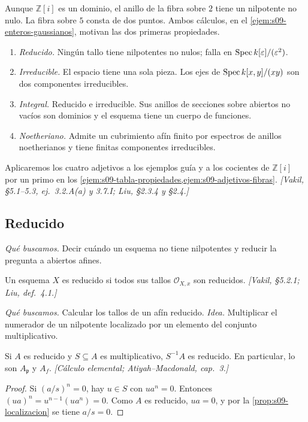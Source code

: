 \begin{obs}
\label{obs:s09-cuatro-propiedades}
Aunque $\mathbb Z[i]$ es un dominio, el anillo de la fibra sobre $2$ tiene un nilpotente no nulo. La fibra sobre $5$ consta de dos puntos. Ambos cálculos, en el \cref{ejem:s09-enteros-gaussianos}, motivan las dos primeras propiedades.
\begin{enumerate}
\item \emph{Reducido.} Ningún tallo tiene nilpotentes no nulos; falla en $\operatorname{Spec} k[\varepsilon]/(\varepsilon^2)$.
\item \emph{Irreducible.} El espacio tiene una sola pieza. Los ejes de $\operatorname{Spec} k[x,y]/(xy)$ son dos componentes irreducibles.
\item \emph{Integral.} Reducido e irreducible. Sus anillos de secciones sobre abiertos no vacíos son dominios y el esquema tiene un cuerpo de funciones.
\item \emph{Noetheriano.} Admite un cubrimiento afín finito por espectros de anillos noetherianos y tiene finitas componentes irreducibles.
\end{enumerate}
Aplicaremos los cuatro adjetivos a los ejemplos guía y a los cocientes de $\mathbb Z[i]$ por un primo en los \cref{ejem:s09-tabla-propiedades,ejem:s09-adjetivos-fibras}. \emph{[Vakil, \S5.1--5.3, ej.~3.2.A(a) y 3.7.I; Liu, \S2.3.4 y \S2.4.]}
\end{obs}

\subsection{Reducido}
\emph{Qué buscamos.} Decir cuándo un esquema no tiene nilpotentes y reducir la pregunta a abiertos afines.

\begin{defi}
\label{defi:s09-esquema-reducido}
Un esquema $X$ es reducido si todos sus tallos $\mathcal O_{X,x}$ son reducidos. \emph{[Vakil, \S5.2.1; Liu, def.~4.1.]}
\end{defi}

\emph{Qué buscamos.} Calcular los tallos de un afín reducido. \emph{Idea.} Multiplicar el numerador de un nilpotente localizado por un elemento del conjunto multiplicativo.

\begin{lema}
\label{lema:s09-localizacion-reducida}
Si $A$ es reducido y $S\subseteq A$ es multiplicativo, $S^{-1}A$ es reducido. En particular, lo son $A_{\mathfrak p}$ y $A_f$. \emph{[Cálculo elemental; Atiyah--Macdonald, cap.~3.]}
\end{lema}
\begin{proof}
Si $(a/s)^n=0$, hay $u\in S$ con $ua^n=0$. Entonces $(ua)^n=u^{n-1}(ua^n)=0$. Como $A$ es reducido, $ua=0$, y por la \cref{prop:s09-localizacion} se tiene $a/s=0$.
\end{proof}

